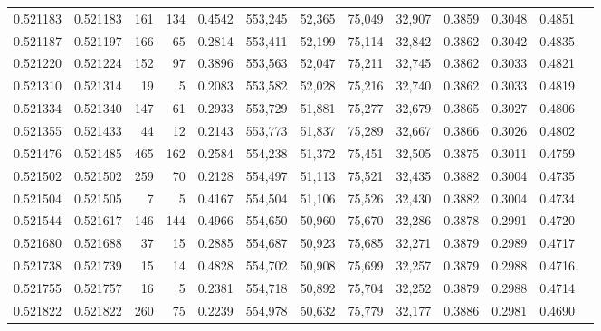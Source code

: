 \begin{tabular}{rrrrrrrrrrrrr}
0.521183 & 0.521183 &   161 &   134 &                                     0.4542 & 553,245 &  52,365 &  75,049 &  32,907 & 0.3859 & 0.3048 & 0.4851 \\
0.521187 & 0.521197 &   166 &    65 &                                     0.2814 & 553,411 &  52,199 &  75,114 &  32,842 & 0.3862 & 0.3042 & 0.4835 \\
0.521220 & 0.521224 &   152 &    97 &                                     0.3896 & 553,563 &  52,047 &  75,211 &  32,745 & 0.3862 & 0.3033 & 0.4821 \\
0.521310 & 0.521314 &    19 &     5 &                                     0.2083 & 553,582 &  52,028 &  75,216 &  32,740 & 0.3862 & 0.3033 & 0.4819 \\
0.521334 & 0.521340 &   147 &    61 &                                     0.2933 & 553,729 &  51,881 &  75,277 &  32,679 & 0.3865 & 0.3027 & 0.4806 \\
0.521355 & 0.521433 &    44 &    12 &                                     0.2143 & 553,773 &  51,837 &  75,289 &  32,667 & 0.3866 & 0.3026 & 0.4802 \\
0.521476 & 0.521485 &   465 &   162 &                                     0.2584 & 554,238 &  51,372 &  75,451 &  32,505 & 0.3875 & 0.3011 & 0.4759 \\
0.521502 & 0.521502 &   259 &    70 &                                     0.2128 & 554,497 &  51,113 &  75,521 &  32,435 & 0.3882 & 0.3004 & 0.4735 \\
0.521504 & 0.521505 &     7 &     5 &                                     0.4167 & 554,504 &  51,106 &  75,526 &  32,430 & 0.3882 & 0.3004 & 0.4734 \\
0.521544 & 0.521617 &   146 &   144 &                                     0.4966 & 554,650 &  50,960 &  75,670 &  32,286 & 0.3878 & 0.2991 & 0.4720 \\
0.521680 & 0.521688 &    37 &    15 &                                     0.2885 & 554,687 &  50,923 &  75,685 &  32,271 & 0.3879 & 0.2989 & 0.4717 \\
0.521738 & 0.521739 &    15 &    14 &                                     0.4828 & 554,702 &  50,908 &  75,699 &  32,257 & 0.3879 & 0.2988 & 0.4716 \\
0.521755 & 0.521757 &    16 &     5 &                                     0.2381 & 554,718 &  50,892 &  75,704 &  32,252 & 0.3879 & 0.2988 & 0.4714 \\
0.521822 & 0.521822 &   260 &    75 &                                     0.2239 & 554,978 &  50,632 &  75,779 &  32,177 & 0.3886 & 0.2981 & 0.4690 \\

\end{tabular}

